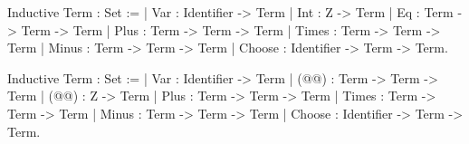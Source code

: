 Inductive Term : Set :=
| Var : Identifier -> Term
| Int : Z -> Term
| Eq : Term -> Term -> Term
| Plus : Term -> Term -> Term
| Times : Term -> Term -> Term
| Minus : Term -> Term -> Term
| Choose : Identifier -> Term -> Term.

Inductive Term : Set :=
| Var : Identifier -> Term
| (@@) : Term -> Term -> Term
| (@@) : Z -> Term
| Plus : Term -> Term -> Term
| Times : Term -> Term -> Term
| Minus : Term -> Term -> Term
| Choose : Identifier -> Term -> Term.
